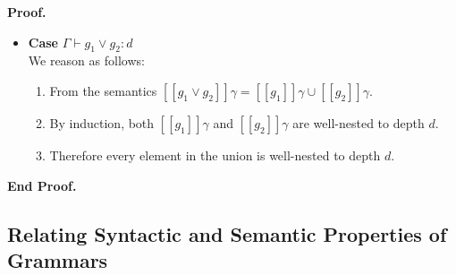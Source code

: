 \documentclass{article}
\newcommand{\lft}[1]{\left<{#1}\right.}
\newcommand{\rgt}[1]{\left.{#1}\right>}
\newcommand{\bnfalt}{\;\;|\;\;}
\newcommand{\judgebalance}[3][\Gamma]{{#1} \vdash {#2} : {#3}}
\newcommand{\interp}[1]{[\![{#1}]\!]}
\newenvironment{proof}{\noindent\textbf{Proof.}}
{\noindent\textbf{End Proof.}}
\newenvironment{caseblock}{\begin{itemize}}{\end{itemize}}
\newenvironment{case}[1]{\item \textbf{Case} {#1}\\}{}
\begin{document}
\begin{proof}
\begin{caseblock}
  \begin{case}{$\judgebalance{g_1 \vee g_2}{d}$}
    We reason as follows:
    \begin{enumerate}
      \item From the semantics $\interp{g_1 \vee g_2}\gamma = \interp{g_1}\gamma \cup \interp{g_2}\gamma$.
      \item By induction, both $\interp{g_1}\gamma$ and $\interp{g_2}\gamma$ are well-nested to depth $d$.
      \item Therefore every element in the union is well-nested to depth $d$. 
    \end{enumerate}
    
  \end{case}
\end{caseblock}

\end{proof}


% 
% 
% 

\subsection{Relating Syntactic and Semantic Properties of Grammars}
\end{document}
